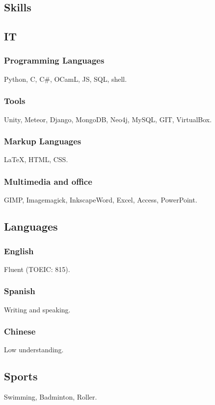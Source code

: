 \documentclass{article}
\begin{document}
\begin{multicols}{2}
        \columnbreak

        \section{Skills}
            \subsection{IT}
                \subsubsection{Programming Languages}
                    Python, C, C\#, OCamL, JS, SQL, shell.
                \subsubsection{Tools}
                    Unity, Meteor, Django,  MongoDB, Neo4j, MySQL, GIT, VirtualBox.
                \subsubsection{Markup Languages}
                    {\LaTeX}, HTML, CSS.
                \subsubsection{Multimedia and office}
                    GIMP, Imagemagick, InkscapeWord, Excel, Access, PowerPoint.
            \subsection{Languages}
                \subsubsection{English}
                    Fluent (TOEIC: 815).
                \subsubsection{Spanish}
                    Writing and speaking.
                \subsubsection{Chinese}
                    Low understanding.
                \subsection{Sports}
                    Swimming, Badminton, Roller.
    \end{multicols}
\end{document}
